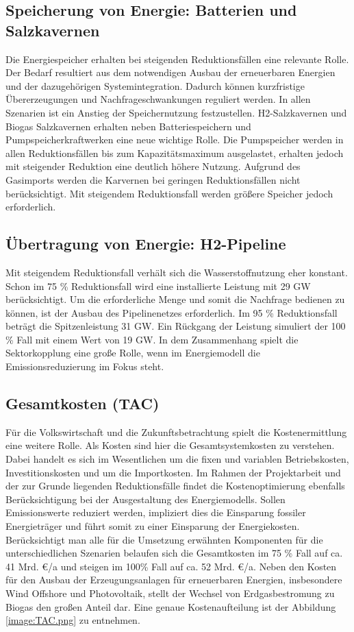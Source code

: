 \subsection{Speicherung von Energie: Batterien und Salzkavernen}
Die Energiespeicher erhalten bei steigenden Reduktionsfällen eine relevante Rolle. Der Bedarf resultiert aus dem notwendigen Ausbau der erneuerbaren Energien und der dazugehörigen Systemintegration. Dadurch können kurzfristige Übererzeugungen und Nachfrageschwankungen reguliert werden. 
\newline
In allen Szenarien ist ein Anstieg der Speichernutzung festzustellen. H2-Salzkavernen und Biogas Salzkavernen erhalten neben Batteriespeichern und Pumpspeicherkraftwerken eine neue wichtige Rolle. Die Pumpspeicher werden in allen Reduktionsfällen bis zum Kapazitätsmaximum ausgelastet, erhalten jedoch mit steigender Reduktion eine deutlich höhere Nutzung. Aufgrund des Gasimports werden die Karvernen bei geringen Reduktionsfällen nicht berücksichtigt. Mit steigendem Reduktionsfall werden größere Speicher jedoch erforderlich.

\subsection{Übertragung von Energie: H2-Pipeline}
Mit steigendem Reduktionsfall verhält sich die Wasserstoffnutzung eher konstant. Schon im 75 \% Reduktionsfall wird eine installierte Leistung mit 29 GW berücksichtigt. Um die erforderliche Menge und somit die Nachfrage bedienen zu können, ist der Ausbau des Pipelinenetzes erforderlich. Im 95 \% Reduktionsfall beträgt die Spitzenleistung 31 GW. Ein Rückgang der Leistung simuliert der 100 \% Fall mit einem Wert von 19 GW. In dem Zusammenhang spielt die Sektorkopplung eine große Rolle, wenn im Energiemodell die Emissionsreduzierung im Fokus steht. 

\subsection{Gesamtkosten (TAC)}
Für die Volkswirtschaft und die Zukunftsbetrachtung spielt die Kostenermittlung eine weitere Rolle. Als Kosten sind hier die Gesamtsystemkosten zu verstehen. Dabei handelt es sich im Wesentlichen um die fixen und variablen Betriebskosten, Investitionskosten und um die Importkosten. Im Rahmen der Projektarbeit und der zur Grunde liegenden Reduktionsfälle findet die Kostenoptimierung ebenfalls Berücksichtigung bei der Ausgestaltung des Energiemodells. Sollen Emissionswerte reduziert werden, impliziert dies die Einsparung fossiler Energieträger und führt somit zu einer Einsparung der Energiekosten. Berücksichtigt man alle für die Umsetzung erwähnten Komponenten für die unterschiedlichen Szenarien belaufen sich die Gesamtkosten im 75 \% Fall auf ca. 41 Mrd. €/a und steigen im 100\% Fall auf ca. 52 Mrd. €/a. Neben den Kosten für den Ausbau der Erzeugungsanlagen für erneuerbaren Energien, insbesondere Wind Offshore und Photovoltaik, stellt der Wechsel von Erdgasbestromung zu Biogas den großen Anteil dar. Eine genaue Kostenaufteilung ist der Abbildung \ref{image:TAC.png} zu entnehmen. 

